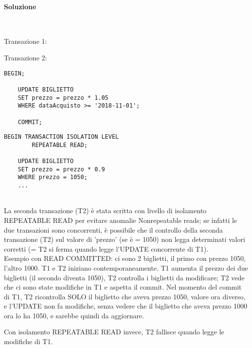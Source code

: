 \documentclass[a4paper, 10pt, titlepage]{article}
\begin{document}
\paragraph{Soluzione}\dotfill 
\\ \lstset{language=SQL}
\begin{minipage}{0.5\textwidth}
 Transazione 1:
\end{minipage}
\begin{minipage}{0.5\textwidth}
Transazione 2:
\end{minipage}
\begin{footnotesize}
\begin{minipage}{0.5\textwidth}
\begin{lstlisting}[tabsize=2]
	BEGIN;

	UPDATE BIGLIETTO 
	SET prezzo = prezzo * 1.05
	WHERE dataAcquisto >= '2018-11-01';
	
	COMMIT;
\end{lstlisting}
\end{minipage}\vrule\hfill
\begin{minipage}{0.5\textwidth}
\begin{lstlisting}[tabsize=2]
	BEGIN TRANSACTION ISOLATION LEVEL 
		REPEATABLE READ;

	UPDATE BIGLIETTO 
	SET prezzo = prezzo * 0.9
	WHERE prezzo = 1050;
	...
\end{lstlisting}
\end{minipage}
\end{footnotesize}\medskip \\
La seconda transazione (T2) è stata scritta con livello di isolamento REPEATABLE READ per evitare anomalie Nonrepeatable reads; se infatti le due transazioni sono concorrenti, è possibile che il controllo della seconda transazione (T2) sul valore di 'prezzo' (se è = 1050) non legga determinati valori corretti (= T2 si ferma quando legge l'UPDATE concorrente di T1). \medskip \\
Esempio con READ COMMITTED: ci sono 2 biglietti, il primo con prezzo 1050, l'altro 1000. T1 e T2 iniziano contemporaneamente. 
T1 aumenta il prezzo dei due biglietti (il secondo diventa 1050), T2 controlla i biglietti da modificare; T2 vede che ci sono state modifiche in T1 e aspetta il commit. Nel momento del commit di T1, T2 ricontrolla SOLO il biglietto che aveva prezzo 1050, valore ora diverso, e l'UPDATE non fa modifiche, senza vedere che il biglietto che aveva prezzo 1000 ora lo ha 1050, e sarebbe quindi da aggiornare.

Con isolamento REPEATABLE READ invece, T2 fallisce quando legge le modifiche di T1.
\end{document}
